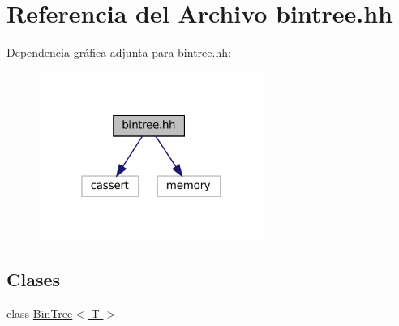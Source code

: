 \hypertarget{bintree_8hh}{}\section{Referencia del Archivo bintree.\+hh}
\label{bintree_8hh}
Dependencia gráfica adjunta para bintree.\+hh\+:
\nopagebreak
\begin{figure}[H]
\begin{center}
\leavevmode
\includegraphics[width=208pt]{bintree_8hh__incl}
\end{center}
\end{figure}
\subsection*{Clases}
\begin{DoxyCompactItemize}
\item 
class \hyperlink{class_bin_tree}{Bin\+Tree$<$ T $>$}
\end{DoxyCompactItemize}
